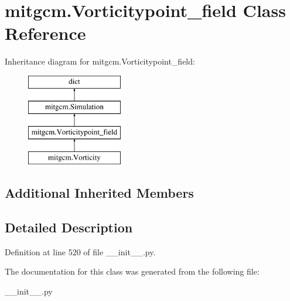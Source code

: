 \hypertarget{classmitgcm_1_1Vorticitypoint__field}{\section{mitgcm.\+Vorticitypoint\+\_\+field Class Reference}
\label{classmitgcm_1_1Vorticitypoint__field}
}
Inheritance diagram for mitgcm.\+Vorticitypoint\+\_\+field\+:\begin{figure}[H]
\begin{center}
\leavevmode
\includegraphics[height=4.000000cm]{classmitgcm_1_1Vorticitypoint__field}
\end{center}
\end{figure}
\subsection*{Additional Inherited Members}


\subsection{Detailed Description}


Definition at line 520 of file \+\_\+\+\_\+init\+\_\+\+\_\+.\+py.



The documentation for this class was generated from the following file\+:\begin{DoxyCompactItemize}
\item 
\+\_\+\+\_\+init\+\_\+\+\_\+.\+py\end{DoxyCompactItemize}
